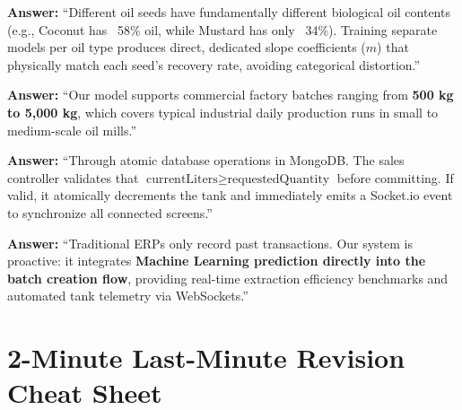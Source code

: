 \documentclass[11pt,a4paper]{article}
\begin{document}
\begin{qabox}
\textbf{Answer:} ``Different oil seeds have fundamentally different biological oil contents (e.g., Coconut has ~58\% oil, while Mustard has only ~34\%). Training separate models per oil type produces direct, dedicated slope coefficients ($m$) that physically match each seed's recovery rate, avoiding categorical distortion.''
\end{qabox}

\begin{qabox}
\textbf{Answer:} ``Our model supports commercial factory batches ranging from \textbf{500 kg to 5,000 kg}, which covers typical industrial daily production runs in small to medium-scale oil mills.''
\end{qabox}

\begin{qabox}
\textbf{Answer:} ``Through atomic database operations in MongoDB. The sales controller validates that $\text{currentLiters} \ge \text{requestedQuantity}$ before committing. If valid, it atomically decrements the tank and immediately emits a Socket.io event to synchronize all connected screens.''
\end{qabox}

\begin{qabox}
\textbf{Answer:} ``Traditional ERPs only record past transactions. Our system is proactive: it integrates \textbf{Machine Learning prediction directly into the batch creation flow}, providing real-time extraction efficiency benchmarks and automated tank telemetry via WebSockets.''
\end{qabox}

\section{2-Minute Last-Minute Revision Cheat Sheet}
\end{document}
